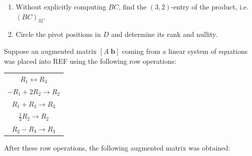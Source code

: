 \documentclass[12pt,letterpaper]{exam}
\begin{document}
\begin{questions}
\begin{enumerate}
\item[(e)] Without explicitly computing $BC$, find the $(3,2)$-entry of the product, i.e. $(BC)_{32}$. \par\vspace{0.3cm}
\wsol{%
	\[
	\begin{aligned}
	(BC)_{32}&= \text{row 3 of } B \cdot \text{column 2 of } C \\[0.2cm]
	&= \langle 1, -2, 1, 0, 2 \rangle \cdot \langle 4, 3, 6, 1, 0 \rangle \\[0.2cm]
	&= 1(4) + (-2) 3 + 1(6) + 0(1) + 2(0) \\[0.2cm]
	&= 4 - 6 + 6 + 0 + 0 \\[0.2cm]
	&= \boxed{4}
	\end{aligned}
	\]%
} \par\vspace{4cm}

\item[(f)] Circle the pivot positions in $D$ and determine its rank and nullity. \par\vspace{0.3cm}
\end{enumerate}



\newpage
\question[15] Suppose an augmented matrix $[A \;\mathbf{b}]$ coming from a linear system of equations was placed into REF using the following row operations: \par
	\begin{table}[!ht]
	\centering
	\begin{tabular}{c}
	$R_1 \longleftrightarrow R_3$ \\[0.1cm]
	$-R_1 + 2R_2 \to R_2$ \\[0.1cm]
	$R_1 + R_3 \to R_3$ \\[0.1cm]
	$\frac{1}{3} R_2 \to R_2$ \\[0.1cm]
	$R_2 - R_3 \to R_3$
	\end{tabular}
	\end{table} \par
After these row operations, the following augmented matrix was obtained:


\end{questions}
\end{document}
